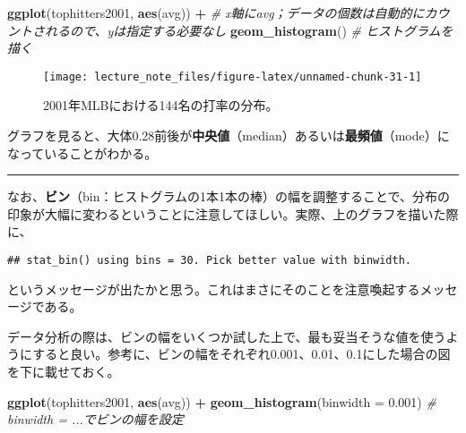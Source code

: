 \documentclass[]{book}
\newenvironment{Shaded}{\begin{snugshade}}{\end{snugshade}}
\newcommand{\KeywordTok}[1]{\textcolor[rgb]{0.13,0.29,0.53}{\textbf{#1}}}
\newcommand{\DataTypeTok}[1]{\textcolor[rgb]{0.13,0.29,0.53}{#1}}
\newcommand{\FloatTok}[1]{\textcolor[rgb]{0.00,0.00,0.81}{#1}}
\newcommand{\StringTok}[1]{\textcolor[rgb]{0.31,0.60,0.02}{#1}}
\newcommand{\CommentTok}[1]{\textcolor[rgb]{0.56,0.35,0.01}{\textit{#1}}}
\newcommand{\OperatorTok}[1]{\textcolor[rgb]{0.81,0.36,0.00}{\textbf{#1}}}
\newcommand{\NormalTok}[1]{#1}
\begin{document}
\begin{Shaded}
\begin{Highlighting}[]
\KeywordTok{ggplot}\NormalTok{(tophitters2001, }\KeywordTok{aes}\NormalTok{(avg)) }\OperatorTok{+}\StringTok{ }\CommentTok{# x軸にavg；データの個数は自動的にカウントされるので、yは指定する必要なし}
\StringTok{  }\KeywordTok{geom_histogram}\NormalTok{() }\CommentTok{# ヒストグラムを描く}
\end{Highlighting}
\end{Shaded}

\begin{figure}

{\centering \texttt{[image: lecture\_note\_files/figure-latex/unnamed-chunk-31-1]} 

}

\caption{2001年MLBにおける144名の打率の分布。}\label{fig:unnamed-chunk-31}
\end{figure}

グラフを見ると、大体0.28前後が\textbf{中央値}（median）あるいは\textbf{最頻値}（mode）になっていることがわかる。

\begin{center}\rule{0.5\linewidth}{\linethickness}\end{center}

なお、\textbf{ビン}（bin：ヒストグラムの1本1本の棒）の幅を調整することで、分布の印象が大幅に変わるということに注意してほしい。実際、上のグラフを描いた際に、

\texttt{\#\#\ \textasciigrave{}stat\_bin()\textasciigrave{}\ using\ \textasciigrave{}bins\ =\ 30\textasciigrave{}.\ Pick\ better\ value\ with\ \textasciigrave{}binwidth\textasciigrave{}.}

というメッセージが出たかと思う。これはまさにそのことを注意喚起するメッセージである。

データ分析の際は、ビンの幅をいくつか試した上で、最も妥当そうな値を使うようにすると良い。参考に、ビンの幅をそれぞれ0.001、0.01、0.1にした場合の図を下に載せておく。



\begin{Shaded}
\begin{Highlighting}[]
\KeywordTok{ggplot}\NormalTok{(tophitters2001, }\KeywordTok{aes}\NormalTok{(avg)) }\OperatorTok{+}
\StringTok{  }\KeywordTok{geom_histogram}\NormalTok{(}\DataTypeTok{binwidth =} \FloatTok{0.001}\NormalTok{) }\CommentTok{# binwidth = ...でビンの幅を設定}
\end{Highlighting}
\end{Shaded}
\end{document}
